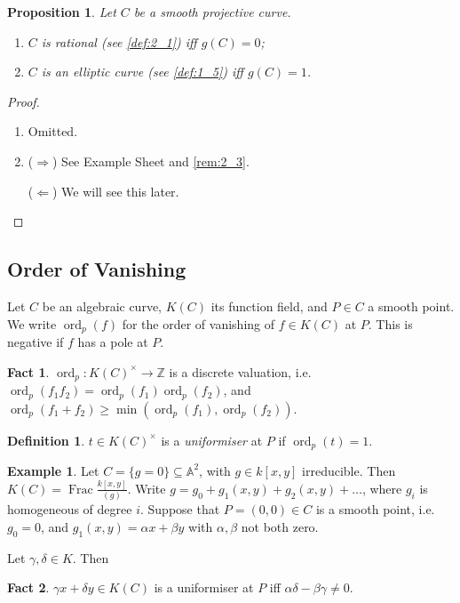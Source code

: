 \documentclass[11pt]{article}
\theoremstyle{definition}
\newtheorem*{definition*}{Definition}
\newtheorem{example}[definition]{Example}
\newtheorem*{fact}{Fact}
\theoremstyle{plain}
\newtheorem{proposition}[definition]{Proposition}
\theoremstyle{remark}
\DeclareMathOperator{\ord}{ord}
\DeclareMathOperator{\Frac}{Frac}
\newcommand{\ZZ}{\mathbb{Z}}
\newcommand{\bA}{\mathbb{A}}
\begin{document}
\begin{proposition}\label{prop:2_4}
    Let $C$ be a smooth projective curve.
    \begin{enumerate}
        \item $C$ is rational (see \autoref{def:2_1}) iff $g(C) = 0$;
        \item $C$ is an elliptic curve (see \autoref{def:1_5}) iff $g(C) = 1$.
    \end{enumerate}
\end{proposition}
\begin{proof}\phantom{}
    \begin{enumerate}
        \item Omitted.

        \item ($\Rightarrow$) See Example Sheet and \autoref{rem:2_3}.

            ($\Leftarrow$) We will see this later. \qedhere
    \end{enumerate}
\end{proof}

\subsection*{Order of Vanishing}

Let $C$ be an algebraic curve, $K(C)$ its function field, and $P \in C$ a smooth point. We write $\ord_p(f)$ for the order of vanishing of $f \in K(C)$ at $P$. This is negative if $f$ has a pole at $P$.

\begin{fact}
    $\ord_p : K(C)^\times \to \ZZ$ is a discrete valuation, i.e. $\ord_p(f_1 f_2) = \ord_p(f_1) \ord_p(f_2)$, and $\ord_p(f_1 + f_2) \ge \min(\ord_p(f_1), \ord_p(f_2))$.
\end{fact}

\begin{definition*}
    $t \in K(C)^\times$ is a \emph{uniformiser} at $P$ if $\ord_p(t) = 1$.
\end{definition*}

\begin{example}\label{eg:2_5}
    Let $C = \{g = 0\} \subseteq \bA^2$, with $g \in k[x,y]$ irreducible. Then $K(C) = \Frac \frac{k[x,y]}{(g)}$. Write $g = g_0 + g_1(x,y) + g_2(x,y) + \ldots$, where $g_i$ is homogeneous of degree $i$. Suppose that $P = (0, 0) \in C$ is a smooth point, i.e. $g_0 = 0$, and $g_1(x,y) = \alpha x + \beta y$ with $\alpha, \beta$ not both zero.

    Let $\gamma, \delta \in K$. Then

    \begin{fact}
        $\gamma x + \delta y \in K(C)$ is a uniformiser at $P$ iff $\alpha \delta - \beta \gamma \neq 0$.
    \end{fact}
\end{example}
\end{document}

